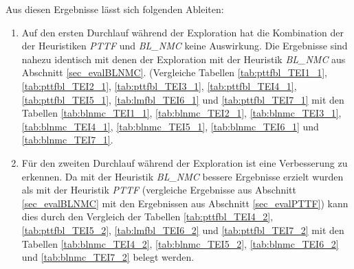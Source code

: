 \begin{multicols}{2}
\columnbreak
{}
\end{multicols}

\begin{multicols}{2}
\columnbreak
{}
\end{multicols}

\begin{multicols}{2}
\columnbreak
{}
\end{multicols}

\begin{multicols}{2}
\columnbreak
{}
\end{multicols}
\noindent
Aus diesen Ergebnisse lässt sich folgenden Ableiten:
\begin{enumerate}
\item Auf den ersten Durchlauf während der Exploration hat die Kombination der der Heuristiken \emph{PTTF} und \emph{BL\_NMC} keine Auswirkung. Die Ergebnisse sind nahezu identisch mit denen der Exploration mit der Heuristik \emph{BL\_NMC} aus Abschnitt \ref{sec_evalBLNMC}. (Vergleiche Tabellen \ref{tab:pttfbl_TEI1_1}, \ref{tab:pttfbl_TEI2_1}, \ref{tab:pttfbl_TEI3_1}, \ref{tab:pttfbl_TEI4_1}, \ref{tab:pttfbl_TEI5_1}, \ref{tab:lmfbl_TEI6_1} und  \ref{tab:pttfbl_TEI7_1} mit den Tabellen \ref{tab:blnmc_TEI1_1}, \ref{tab:blnmc_TEI2_1}, \ref{tab:blnmc_TEI3_1}, \ref{tab:blnmc_TEI4_1}, \ref{tab:blnmc_TEI5_1}, \ref{tab:blnmc_TEI6_1} und \ref{tab:blnmc_TEI7_1}.
\item Für den zweiten Durchlauf während der Exploration ist eine Verbesserung  zu erkennen. Da mit der Heuristik \emph{BL\_NMC} bessere Ergebnisse erzielt wurden als mit der Heuristik \emph{PTTF} (vergleiche Ergebnisse aus Abschnitt \ref{sec_evalBLNMC} mit den Ergebnissen aus Abschnitt \ref{sec_evalPTTF}) kann dies durch den Vergleich der Tabellen \ref{tab:pttfbl_TEI4_2}, \ref{tab:pttfbl_TEI5_2}, \ref{tab:lmfbl_TEI6_2} und  \ref{tab:pttfbl_TEI7_2} mit den Tabellen \ref{tab:blnmc_TEI4_2}, \ref{tab:blnmc_TEI5_2}, \ref{tab:blnmc_TEI6_2} und \ref{tab:blnmc_TEI7_2} belegt werden.
\end{enumerate}


